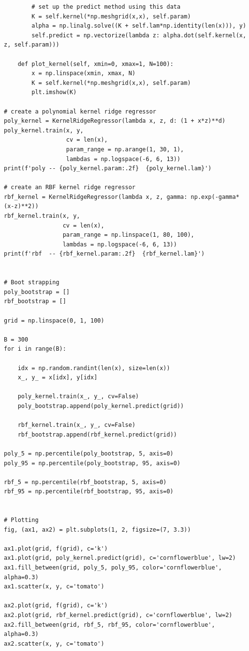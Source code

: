 \documentclass{article}
\begin{document}
\begin{verbatim}
        # set up the predict method using this data
        K = self.kernel(*np.meshgrid(x,x), self.param)
        alpha = np.linalg.solve((K + self.lam*np.identity(len(x))), y)
        self.predict = np.vectorize(lambda z: alpha.dot(self.kernel(x, z, self.param)))
        
    def plot_kernel(self, xmin=0, xmax=1, N=100):
        x = np.linspace(xmin, xmax, N)
        K = self.kernel(*np.meshgrid(x,x), self.param)
        plt.imshow(K)

# create a polynomial kernel ridge regressor
poly_kernel = KernelRidgeRegressor(lambda x, z, d: (1 + x*z)**d)
poly_kernel.train(x, y,
                  cv = len(x),
                  param_range = np.arange(1, 30, 1), 
                  lambdas = np.logspace(-6, 6, 13))
print(f'poly -- {poly_kernel.param:.2f}  {poly_kernel.lam}')

# create an RBF kernel ridge regressor
rbf_kernel = KernelRidgeRegressor(lambda x, z, gamma: np.exp(-gamma*(x-z)**2))
rbf_kernel.train(x, y,
                 cv = len(x),
                 param_range = np.linspace(1, 80, 100), 
                 lambdas = np.logspace(-6, 6, 13))
print(f'rbf  -- {rbf_kernel.param:.2f}  {rbf_kernel.lam}')


# Boot strapping
poly_bootstrap = []
rbf_bootstrap = []

grid = np.linspace(0, 1, 100)

B = 300
for i in range(B):
    
    idx = np.random.randint(len(x), size=len(x))
    x_, y_ = x[idx], y[idx]

    poly_kernel.train(x_, y_, cv=False)
    poly_bootstrap.append(poly_kernel.predict(grid))
    
    rbf_kernel.train(x_, y_, cv=False)
    rbf_bootstrap.append(rbf_kernel.predict(grid))

poly_5 = np.percentile(poly_bootstrap, 5, axis=0)
poly_95 = np.percentile(poly_bootstrap, 95, axis=0)

rbf_5 = np.percentile(rbf_bootstrap, 5, axis=0)
rbf_95 = np.percentile(rbf_bootstrap, 95, axis=0)


# Plotting
fig, (ax1, ax2) = plt.subplots(1, 2, figsize=(7, 3.3))

ax1.plot(grid, f(grid), c='k')
ax1.plot(grid, poly_kernel.predict(grid), c='cornflowerblue', lw=2)
ax1.fill_between(grid, poly_5, poly_95, color='cornflowerblue', alpha=0.3)
ax1.scatter(x, y, c='tomato')

ax2.plot(grid, f(grid), c='k')
ax2.plot(grid, rbf_kernel.predict(grid), c='cornflowerblue', lw=2)
ax2.fill_between(grid, rbf_5, rbf_95, color='cornflowerblue', alpha=0.3)
ax2.scatter(x, y, c='tomato')


\end{verbatim}
\end{document}
